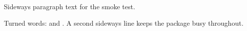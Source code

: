 \documentclass{article}
\begin{document}
\begin{sideways}Sideways paragraph text for the smoke test.\end{sideways}
Turned words:  and .
A second sideways line keeps the package busy throughout.
\end{document}
